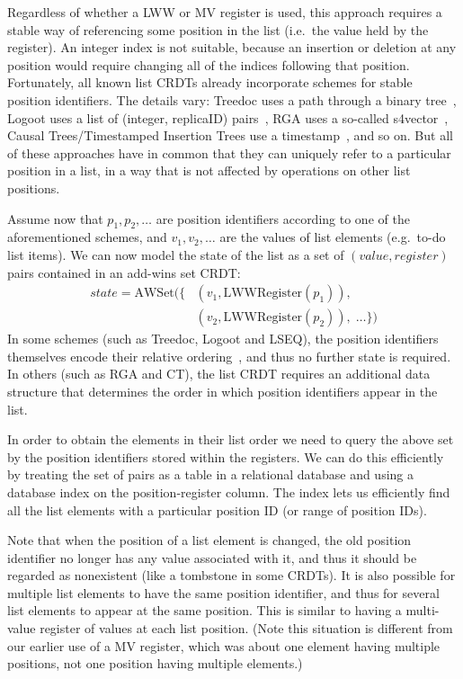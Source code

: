 \documentclass[sigplan,10pt]{acmart}
\begin{document}
Regardless of whether a LWW or MV register is used, this approach requires a stable way of referencing some position in the list (i.e.\ the value held by the register).
An integer index is not suitable, because an insertion or deletion at any position would require changing all of the indices following that position.
Fortunately, all known list CRDTs already incorporate schemes for stable position identifiers.
The details vary: Treedoc uses a path through a binary tree~\cite{Preguica:2009fz}, Logoot uses a list of (integer, replicaID) pairs~\cite{Weiss:2009ht}, RGA uses a so-called s4vector~\cite{Roh:2011dw}, Causal Trees/Timestamped Insertion Trees use a timestamp~\cite{Grishchenko:2014eh,Attiya:2016kh}, and so on.
But all of these approaches have in common that they can uniquely refer to a particular position in a list, in a way that is not affected by operations on other list positions.

Assume now that $p_1, p_2, \dots$ are position identifiers according to one of the aforementioned schemes, and $v_1, v_2, \dots$ are the values of list elements (e.g.\ to-do list items).
We can now model the state of the list as a set of $(\mathit{value}, \mathit{register})$ pairs contained in an add-wins set CRDT:
\begin{align*}
\mathit{state} = \mathrm{AWSet}(\{ & (v_1, \mathrm{LWWRegister}(p_1)),\\
    & (v_2, \mathrm{LWWRegister}(p_2)), \;\dots\})
\end{align*}
In some schemes (such as Treedoc, Logoot and LSEQ), the position identifiers themselves encode their relative ordering~\cite{Interleaving}, and thus no further state is required.
In others (such as RGA and CT), the list CRDT requires an additional data structure that determines the order in which position identifiers appear in the list.

In order to obtain the elements in their list order we need to query the above set by the position identifiers stored within the registers.
We can do this efficiently by treating the set of pairs as a table in a relational database and using a database index on the position-register column.
The index lets us efficiently find all the list elements with a particular position ID (or range of position IDs).

Note that when the position of a list element is changed, the old position identifier no longer has any value associated with it, and thus it should be regarded as nonexistent (like a tombstone in some CRDTs).
It is also possible for multiple list elements to have the same position identifier, and thus for several list elements to appear at the same position.
This is similar to having a multi-value register of values at each list position.
(Note this situation is different from our earlier use of a MV register, which was about one element having multiple positions, not one position having multiple elements.)
\end{document}
